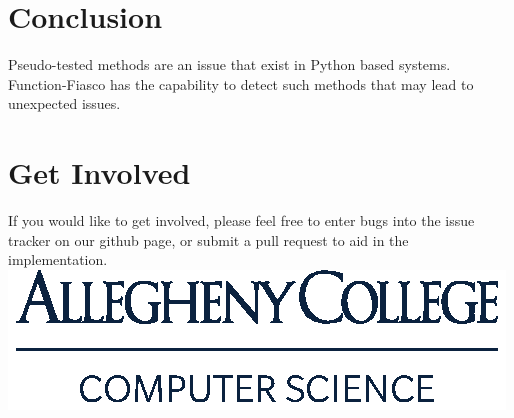 \documentclass[a0paper,fleqn]{betterposter}
\begin{document}
{\section{Conclusion}
Pseudo-tested methods are an issue that exist in Python based systems. Function-Fiasco has the capability to detect such methods that may lead to unexpected issues.



\section{Get Involved}
If you would like to get involved, please feel free to enter bugs into the issue tracker on our github page, or submit a pull request to aid in the implementation.
\vfill
\includegraphics[width=\textwidth]{img/ComputerScience-Stack}
}
\end{document}
